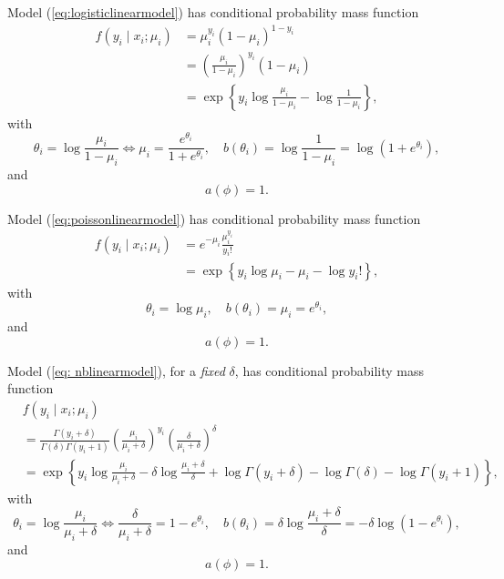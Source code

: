 \begin{example}[continued]\label{eg::binarylogisticmodel-continue}
 Model (\ref{eq:logisticlinearmodel}) has conditional probability
mass function
\begin{align*}
f(y_{i}  \mid x_{i};\mu_{i}) &=\mu_{i}^{y_{i}}(1-\mu_{i})^{1-y_{i}} \\
&=\left(\frac{\mu_{i}}{1-\mu_{i}}\right)^{y_{i}}(1-\mu_{i})\\
 & =\exp\left\{ y_{i}\log\frac{\mu_{i}}{1-\mu_{i}}-\log\frac{1}{1-\mu_{i}}\right\} ,
\end{align*}
with
\[
\theta_{i}=\log\frac{\mu_{i}}{1-\mu_{i}} \Longleftrightarrow \mu_i = \frac{e^{\theta_{i}}}{1 + e^{\theta_{i}}},
\quad b(\theta_{i})=\log\frac{1}{1-\mu_{i}}=\log(1+e^{\theta_{i}}),
\]
and
$$
 a(\phi)=1.
$$
\end{example}


\begin{example}[continued]\label{eg::countpoissonmodel-continue}
 Model (\ref{eq:poissonlinearmodel}) has conditional probability mass
function
\begin{align*}
f(y_{i}  \mid x_{i};\mu_{i}) &=e^{-\mu_{i}}\frac{\mu_{i}^{y_i}}{y_i!} \\
&  =\exp\left\{ y_{i}\log\mu_{i}-\mu_{i}-\log y_{i}!\right\} ,
\end{align*}
with
\[
\theta_{i}=\log\mu_{i},\quad b(\theta_{i})=\mu_{i}=e^{\theta_{i}},
\]
and
$$
a(\phi)=1.
$$
\end{example}


\begin{example}[continued]\label{eg::countnbmodel-continue}
 Model (\ref{eq: nblinearmodel}), for a {\it fixed} $\delta$, has conditional
probability mass function
\begin{align*}
&f(y_{i}  \mid x_{i};\mu_{i})  \\
& =\frac{\Gamma(y_{i}+\delta)}{\Gamma(\delta )\Gamma(y_{i}+1)}\left(\frac{\mu_{i}}{\mu_{i}+\delta}\right)^{y_{i}}\left(\frac{\delta}{\mu_{i}+\delta}\right)^{\delta}\\
 & =\exp\left\{ y_{i}\log\frac{\mu_{i}}{\mu_{i}+\delta}-\delta\log\frac{\mu_{i}+\delta}{\delta}  
  +\log\Gamma(y_{i}+\delta)-\log\Gamma(\delta)-\log\Gamma(y_{i}+1)\right\} ,
\end{align*}
with 
\[
\theta_{i}=\log\frac{\mu_{i}}{\mu_{i}+\delta}  \Longleftrightarrow  \frac{\delta}{  \mu_{i}+\delta  } = 1- e^{\theta_i}  ,
\quad b(\theta_{i})=\delta\log\frac{\mu_{i}+\delta}{\delta}= - \delta\log (1-e^{\theta_{i}}) ,
\]
and
$$
 a(\phi)=1.
$$
\end{example}



